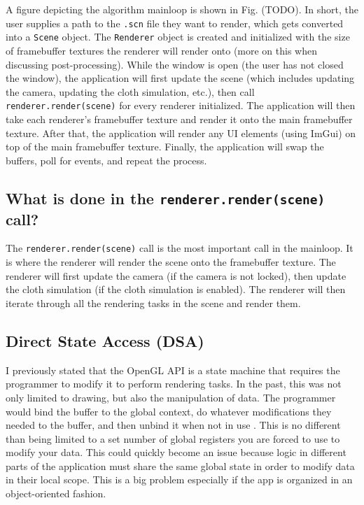 \documentclass[letterpaper, 10 pt, conference]{ieeeconf}  %
\begin{document}
A figure depicting the algorithm mainloop is shown in Fig. (TODO). In short, the user supplies a path to the \texttt{.scn} file they want to render, which gets converted into a \texttt{Scene} object. The \texttt{Renderer} object is created and initialized with the size of framebuffer textures the renderer will render onto (more on this when discussing post-processing). While the window is open (the user has not closed the window), the application will first update the scene (which includes updating the camera, updating the cloth simulation, etc.), then call \texttt{renderer.render(scene)} for every renderer initialized. The application will then take each renderer's framebuffer texture and render it onto the main framebuffer texture. After that, the application will render any UI elements (using ImGui) on top of the main framebuffer texture. Finally, the application will swap the buffers, poll for events, and repeat the process.

\subsection{What is done in the \texttt{renderer.render(scene)} call?}
The \texttt{renderer.render(scene)} call is the most important call in the mainloop. It is where the renderer will render the scene onto the framebuffer texture. The renderer will first update the camera (if the camera is not locked), then update the cloth simulation (if the cloth simulation is enabled). The renderer will then iterate through all the rendering tasks in the scene and render them.


\subsection {Direct State Access (DSA)}
I previously stated that the OpenGL API is a state machine that requires the programmer to modify it to perform rendering tasks. In the past, this was not only limited to drawing, but also the manipulation of data. The programmer would bind the buffer to the global context, do whatever modifications they needed to the buffer, and then unbind it when not in use \cite{StephanoDSA}. This is no different than being limited to a set number of global registers you are forced to use to modify your data. This could quickly become an issue because logic in different parts of the application must share the same global state in order to modify data in their local scope. This is a big problem especially if the app is organized in an object-oriented fashion.
\end{document}
